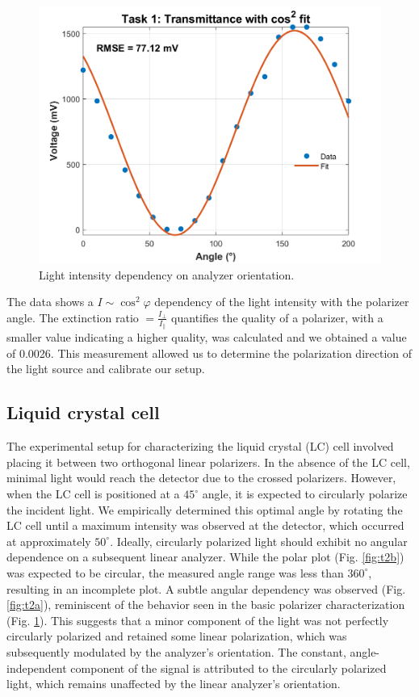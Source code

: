 \documentclass[12pt,a4paper]{article}
\begin{document}
\begin{figure} [H]
    \centering
    \includegraphics[width=0.6\linewidth]{figs/task1_transmittance_with_cos_squared_fit.png}
    \caption{Light intensity dependency on analyzer orientation.}
    \label{fig:t1}
\end{figure}

The data shows a $I \sim \cos^2\varphi$ dependency of the light intensity with the polarizer angle. The extinction ratio $= \frac{I_\perp}{I_\parallel}$ quantifies the quality of a polarizer, with a smaller value indicating a higher quality, was calculated and we obtained a value of 0.0026. This measurement allowed us to determine the polarization direction of the light source and calibrate our setup.

\subsection{Liquid crystal cell}
The experimental setup for characterizing the liquid crystal (LC) cell involved placing it between two orthogonal linear polarizers. In the absence of the LC cell, minimal light would reach the detector due to the crossed polarizers. However, when the LC cell is positioned at a \( 45^\circ \) angle, it is expected to circularly polarize the incident light. We empirically determined this optimal angle by rotating the LC cell until a maximum intensity was observed at the detector, which occurred at approximately \( 50^\circ \). Ideally, circularly polarized light should exhibit no angular dependence on a subsequent linear analyzer. While the polar plot (Fig. \ref{fig:t2b}) was expected to be circular, the measured angle range was less than \( 360^\circ \), resulting in an incomplete plot. A subtle angular dependency was observed (Fig. \ref{fig:t2a}), reminiscent of the behavior seen in the basic polarizer characterization (Fig. \ref{fig:t1}). This suggests that a minor component of the light was not perfectly circularly polarized and retained some linear polarization, which was subsequently modulated by the analyzer's orientation. The constant, angle-independent component of the signal is attributed to the circularly polarized light, which remains unaffected by the linear analyzer's orientation.
\end{document}
